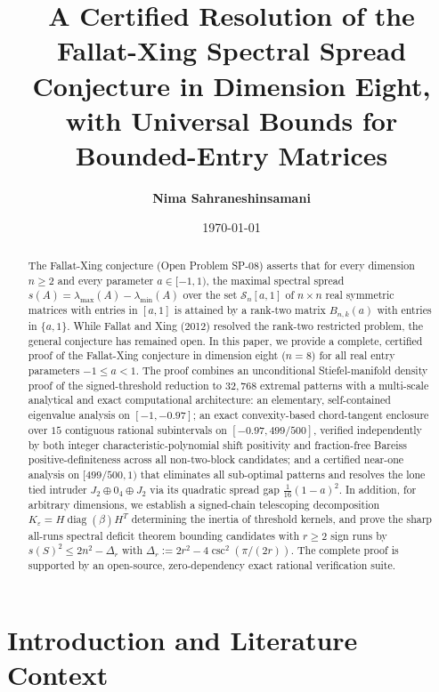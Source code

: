 \documentclass[11pt,reqno]{article}
\title{\textbf{A Certified Resolution of the Fallat-Xing Spectral Spread Conjecture in Dimension Eight, with Universal Bounds for Bounded-Entry Matrices}}
\author{\textbf{Nima Sahraneshinsamani}}
\date{\today}
\theoremstyle{definition}
\begin{document}
\maketitle

\begin{abstract}
The Fallat-Xing conjecture (Open Problem SP-08) asserts that for every dimension $n \ge 2$ and every parameter $a \in [-1, 1)$, the maximal spectral spread $s(A) = \lambda_{\max}(A) - \lambda_{\min}(A)$ over the set $\mathcal{S}_n[a, 1]$ of $n \times n$ real symmetric matrices with entries in $[a, 1]$ is attained by a rank-two matrix $B_{n, k}(a)$ with entries in $\{a, 1\}$. While Fallat and Xing (2012) resolved the rank-two restricted problem, the general conjecture has remained open. In this paper, we provide a complete, certified proof of the Fallat-Xing conjecture in dimension eight ($n=8$) for all real entry parameters $-1 \le a < 1$. The proof combines an unconditional Stiefel-manifold density proof of the signed-threshold reduction to $32{,}768$ extremal patterns with a multi-scale analytical and exact computational architecture: an elementary, self-contained eigenvalue analysis on $[-1, -0.97]$; an exact convexity-based chord-tangent enclosure over $15$ contiguous rational subintervals on $[-0.97, 499/500]$, verified independently by both integer characteristic-polynomial shift positivity and fraction-free Bareiss positive-definiteness across all non-two-block candidates; and a certified near-one analysis on $[499/500, 1)$ that eliminates all sub-optimal patterns and resolves the lone tied intruder $J_2 \oplus 0_4 \oplus J_2$ via its quadratic spread gap $\frac{1}{16}(1-a)^2$. In addition, for arbitrary dimensions, we establish a signed-chain telescoping decomposition $K_\varepsilon = H \operatorname{diag}(\beta) H^T$ determining the inertia of threshold kernels, and prove the sharp all-runs spectral deficit theorem bounding candidates with $r \ge 2$ sign runs by $s(S)^2 \le 2n^2 - \Delta_r$ with $\Delta_r := 2r^2 - 4\csc^2(\pi/(2r))$. The complete proof is supported by an open-source, zero-dependency exact rational verification suite.
\end{abstract}

\section{Introduction and Literature Context}
\end{document}

